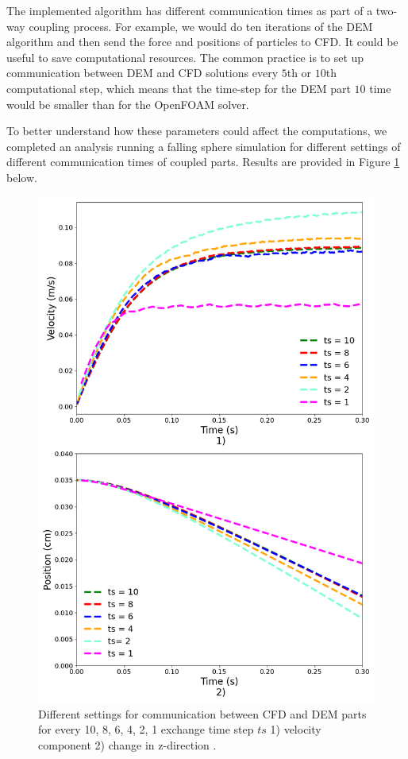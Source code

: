 The implemented algorithm has different communication times as part of a two-way coupling process. For example, we would do ten iterations of the DEM algorithm and then send the force and positions of particles to CFD. It could be useful to save computational resources. The common practice is to set up communication between DEM and CFD solutions every $5$th or $10$th computational step, which means that the time-step for the DEM part $10$ time would be smaller than for the OpenFOAM solver.

To better understand how these parameters could affect the computations, we completed an analysis running a falling sphere simulation for different settings of different communication times of coupled parts. Results are provided in Figure \ref{fig:communication} below.

\begin{figure}[!h]
    \centering
    \includegraphics[width=13cm]{ GWU_Thesis_Sarmakeeva/Images/chap3/nan_simulation_192000_diff_exchange_time.png}
   \caption{Different settings for communication between CFD and DEM parts for every 10, 8, 6, 4, 2, 1 exchange time step  $ts$ 1) velocity component 2) change in z-direction .}
    \label{fig:communication}
\end{figure}

